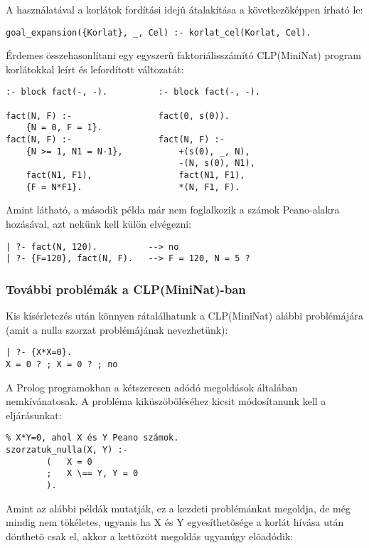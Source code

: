 A  használatával a korlátok fordítási idejû átalakítása
a következõképpen írható le:

\begin{verbatim}
goal_expansion({Korlat}, _, Cel) :- korlat_cel(Korlat, Cel).
\end{verbatim}

Érdemes összehasonlítani egy egyszerû faktoriálisszámító CLP(MiniNat)
program korlátokkal leírt és lefordított változatát:

\begin{verbatim}
:- block fact(-, -).          :- block fact(-, -).

fact(N, F) :-                 fact(0, s(0)).
    {N = 0, F = 1}.
fact(N, F) :-                 fact(N, F) :-
    {N >= 1, N1 = N-1},           +(s(0), _, N),
                                  -(N, s(0), N1),
    fact(N1, F1),                 fact(N1, F1),
    {F = N*F1}.                   *(N, F1, F).
\end{verbatim}

Amint látható, a második példa már nem foglalkozik a számok Peano-alakra
hozásával, azt nekünk kell külön elvégezni:

\begin{verbatim}
| ?- fact(N, 120).          --> no 
| ?- {F=120}, fact(N, F).   --> F = 120, N = 5 ?
\end{verbatim}

\subsubsection{További problémák a CLP(MiniNat)-ban}

Kis kísérletezés után könnyen rátalálhatunk a CLP(MiniNat) alábbi problémájára
(amit a nulla szorzat problémájának nevezhetünk):

\begin{verbatim}
| ?- {X*X=0}.
X = 0 ? ; X = 0 ? ; no
\end{verbatim}

A Prolog programokban a kétszeresen adódó megoldások általában nemkívánatosak.
A probléma kiküszöböléséhez kicsit módosítanunk kell a 
eljárásunkat:

\begin{verbatim}
% X*Y=0, ahol X és Y Peano számok.
szorzatuk_nulla(X, Y) :-
        (   X = 0 
        ;   X \== Y, Y = 0 
        ).
\end{verbatim}

Amint az alábbi példák mutatják, ez a kezdeti problémánkat megoldja, de
még mindig nem tökéletes, ugyanis ha X és Y egyesíthetõsége a korlát hívása
után dönthetõ csak el, akkor a kettõzött megoldás ugyanúgy elõadódik:

